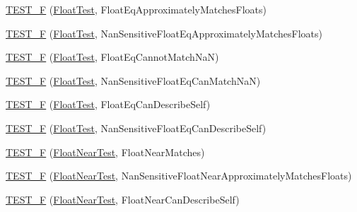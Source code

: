 \begin{DoxyCompactItemize}
\hyperlink{namespacetesting_1_1gmock__matchers__test_a69257e935b4334c835b3ad26acea9104}{T\+E\+S\+T\+\_\+F} (\hyperlink{namespacetesting_1_1gmock__matchers__test_a145329e433869625f9f0e98a0cdfd7b4}{Float\+Test}, Float\+Eq\+Approximately\+Matches\+Floats)
\item 
\hyperlink{namespacetesting_1_1gmock__matchers__test_abb691880cd22f6f444c978547b13f792}{T\+E\+S\+T\+\_\+F} (\hyperlink{namespacetesting_1_1gmock__matchers__test_a145329e433869625f9f0e98a0cdfd7b4}{Float\+Test}, Nan\+Sensitive\+Float\+Eq\+Approximately\+Matches\+Floats)
\item 
\hyperlink{namespacetesting_1_1gmock__matchers__test_a111f0c8a5ec17b47e8eb6226e1c2cb58}{T\+E\+S\+T\+\_\+F} (\hyperlink{namespacetesting_1_1gmock__matchers__test_a145329e433869625f9f0e98a0cdfd7b4}{Float\+Test}, Float\+Eq\+Cannot\+Match\+NaN)
\item 
\hyperlink{namespacetesting_1_1gmock__matchers__test_a4e9d89902e088a10915b4f9463ac0f09}{T\+E\+S\+T\+\_\+F} (\hyperlink{namespacetesting_1_1gmock__matchers__test_a145329e433869625f9f0e98a0cdfd7b4}{Float\+Test}, Nan\+Sensitive\+Float\+Eq\+Can\+Match\+NaN)
\item 
\hyperlink{namespacetesting_1_1gmock__matchers__test_a264de01a5019e5c358116845bf5edd14}{T\+E\+S\+T\+\_\+F} (\hyperlink{namespacetesting_1_1gmock__matchers__test_a145329e433869625f9f0e98a0cdfd7b4}{Float\+Test}, Float\+Eq\+Can\+Describe\+Self)
\item 
\hyperlink{namespacetesting_1_1gmock__matchers__test_a95a2bbc273ff70fc364c5c9c4697834c}{T\+E\+S\+T\+\_\+F} (\hyperlink{namespacetesting_1_1gmock__matchers__test_a145329e433869625f9f0e98a0cdfd7b4}{Float\+Test}, Nan\+Sensitive\+Float\+Eq\+Can\+Describe\+Self)
\item 
\hyperlink{namespacetesting_1_1gmock__matchers__test_a6897409da5003f20f891d8a5ecabdc99}{T\+E\+S\+T\+\_\+F} (\hyperlink{namespacetesting_1_1gmock__matchers__test_a426b51f464dcb48033946e1bf3cc8795}{Float\+Near\+Test}, Float\+Near\+Matches)
\item 
\hyperlink{namespacetesting_1_1gmock__matchers__test_ad396e996ed685fd80cbd78740b8d01a8}{T\+E\+S\+T\+\_\+F} (\hyperlink{namespacetesting_1_1gmock__matchers__test_a426b51f464dcb48033946e1bf3cc8795}{Float\+Near\+Test}, Nan\+Sensitive\+Float\+Near\+Approximately\+Matches\+Floats)
\item 
\hyperlink{namespacetesting_1_1gmock__matchers__test_ad56232046efe7b4d5169a15fd15a2001}{T\+E\+S\+T\+\_\+F} (\hyperlink{namespacetesting_1_1gmock__matchers__test_a426b51f464dcb48033946e1bf3cc8795}{Float\+Near\+Test}, Float\+Near\+Can\+Describe\+Self)

\end{DoxyCompactItemize}
